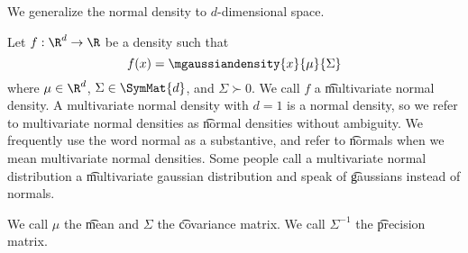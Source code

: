 
We generalize the normal density
to $d$-dimensional space.


Let $f: \R^d \to \R$ be a density such that $$f(x) = \mgaussiandensity{x}{\mu}{\Sigma}$$ where $\mu \in \R^d$, $\Sigma \in \SymMat{d}$, and $\Sigma \succ 0$.
We call $f$ a \t{multivariate normal density}.
A multivariate normal density with $d = 1$ is a normal density, so we refer to multivariate normal densities as \t{normal densities} without ambiguity.
We frequently use the word normal as a substantive, and refer to \t{normals} when we mean multivariate normal densities.
Some people call a multivariate normal distribution a \t{multivariate gaussian distribution} and speak of \t{gaussians} instead of normals.

We call $\mu$ the \t{mean} and $\Sigma$ the \t{covariance matrix}.
We call $\Sigma^{-1}$ the \t{precision matrix}.
\strats
